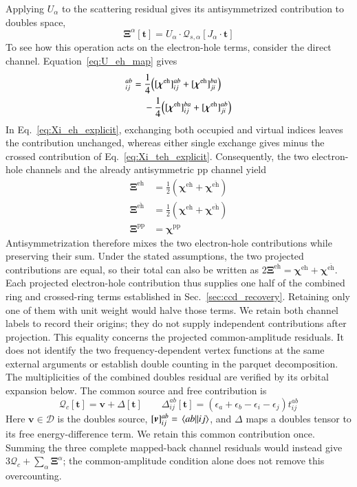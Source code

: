 \documentclass[aip,jcp,reprint,noshowkeys,superscriptaddress]{revtex4-1}
\newcommand{\eh}{\text{eh}}
\newcommand{\teh}{{\overline{\text{eh}}}}
\newcommand{\pp}{\text{pp}}
\newcommand{\bt}{\boldsymbol{t}}
\newcommand{\bXi}{\boldsymbol{\Xi}}
\newcommand{\bchi}{\boldsymbol{\chi}}
\newcommand{\bcalQ}{\boldsymbol{\mathcal{Q}}}
\begin{document}
Applying $U_{\alpha}$ to the scattering residual gives its antisymmetrized
contribution to doubles space,
\begin{equation}
 \bXi^{\alpha}[\bt]=U_{\alpha}\cdot\bcalQ_{s,\alpha}[J_{\alpha}\cdot\bt]
 \label{eq:Xi_weighted_map}
\end{equation}
To see how this operation acts on the electron-hole terms, consider the
direct channel. Equation~\eqref{eq:U_eh_map} gives
\begin{align}
 [\bXi^{\eh}]_{ij}^{ab}
 ={}&\frac14\qty([\bchi^{\eh}]_{ij}^{ab}
                  +[\bchi^{\eh}]_{ji}^{ba})
 \nonumber\\
 &-\frac14\qty([\bchi^{\eh}]_{ij}^{ba}
                  +[\bchi^{\eh}]_{ji}^{ab})
 \label{eq:direct_antisymmetrization}
\end{align}
In Eq.~\eqref{eq:Xi_eh_explicit}, exchanging both occupied and virtual
indices leaves the contribution unchanged, whereas either single exchange
gives minus the crossed contribution of Eq.~\eqref{eq:Xi_teh_explicit}.
Consequently, the two electron-hole channels and the already antisymmetric
$\pp$ channel yield
\begin{align}
 \bXi^{\eh}&=\tfrac12(\bchi^{\eh}+\bchi^{\teh})
 \label{eq:projected_eh_identity}
 \\
 \bXi^{\teh}&=\tfrac12(\bchi^{\eh}+\bchi^{\teh})
 \\
 \bXi^{\pp}&=\bchi^{\pp}
 \label{eq:projected_channel_identity}
\end{align}
Antisymmetrization therefore mixes the two electron-hole contributions
while preserving their sum. Under the stated assumptions, the two projected
contributions are equal, so their total can also be written as
$2\bXi^{\eh}=\bchi^{\eh}+\bchi^{\teh}$. Each projected electron-hole
contribution thus supplies one half of the combined ring and crossed-ring
terms established in Sec.~\ref{sec:ccd_recovery}. Retaining only one of
them with unit weight would halve those terms. We retain both channel
labels to record their origins; they do not supply independent contributions
after projection. This equality concerns the projected common-amplitude
residuals. It does not identify the two frequency-dependent vertex
functions at the same external arguments or establish double counting in
the parquet decomposition. The multiplicities of the combined doubles
residual are verified by its orbital expansion below.
The common source and free contribution is
\begin{equation}
    \bcalQ_c[\bt]
    =
    \boldsymbol{v}+\Delta[\bt]
    \qquad
    \Delta_{ij}^{ab}[\bt]
    =
    (\epsilon_a+\epsilon_b-\epsilon_i-\epsilon_j)t_{ij}^{ab}
    \label{eq:common_residual_weight}
\end{equation}
Here $\boldsymbol{v}\in\mathscr D$ is the doubles source,
$[\boldsymbol{v}]_{ij}^{ab}=\mel{ab}{}{ij}$, and $\Delta$ maps a doubles tensor to
its free energy-difference term. We retain this common contribution once.
Summing the three complete mapped-back channel residuals would instead give
$3\bcalQ_c+\sum_{\alpha}\bXi^{\alpha}$; the common-amplitude condition alone does not
remove this overcounting.
\end{document}
